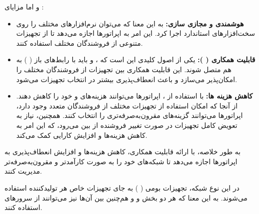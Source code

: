\documentclass[landscape, 12pt]{report}
\begin{document}
	و اما مزایای 
	:
\begin{itemize}
\item \textbf{هوشمندی و مجازی سازی:}
به این معنا که می‌توان نرم‌افزارهای مختلف را روی سخت‌افزارهای استاندارد اجرا کرد. این امر به اپراتورها اجازه می‌دهد تا از تجهیزات متنوعی از فروشندگان مختلف استفاده کنند.
\item 
\textbf{قابلیت همکاری (
): }
یکی از اصول کلیدی 
 این است که
  ،
    و
      باید با رابط‌های باز
       (
       ) به هم متصل شوند. این قابلیت همکاری بین تجهیزات از فروشندگان مختلف را امکان‌پذیر می‌سازد و باعث انعطاف‌پذیری بیشتر در انتخاب تجهیزات می‌شود.


\item \textbf{کاهش هزینه ها:} 
با استفاده از 
، اپراتورها می‌توانند هزینه‌های
  و
    خود را کاهش دهند. از آنجا که امکان استفاده از تجهیزات مختلف از فروشندگان متعدد وجود دارد، اپراتورها می‌توانند گزینه‌های مقرون‌به‌صرفه‌تری را انتخاب کنند. همچنین، نیاز به تعویض کامل تجهیزات در صورت تغییر فروشنده از بین می‌رود، که این امر به کاهش هزینه‌ها و افزایش کارایی کمک می‌کند.

\end{itemize}
	به طور خلاصه،
	 با ارائه قابلیت همکاری، کاهش هزینه‌ها و افزایش انعطاف‌پذیری به اپراتورها اجازه می‌دهد تا شبکه‌های خود را به صورت کارآمدتر و مقرون‌به‌صرفه‌تر مدیریت کنند.
	
	در این نوع شبکه، تجهیزات بومی (
	) به جای تجهیزات خاص هر تولیدکننده استفاده می‌شوند. به این معنا که هر دو بخش
 و
    و هم‌چنین
     بین آن‌ها نیز می‌توانند از سرورهای 
      استفاده کنند.
	
\end{document}
